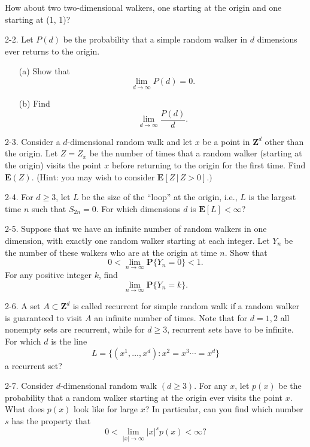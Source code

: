 \documentclass{stml-l}
\theoremstyle{definition}
\numberwithin{equation}{chapter}
\numberwithin{figure}{chapter}
\numberwithin{figure}{section}
\begin{document}
How about two two-dimensional walkers, one starting at the origin
and one starting at (1, 1)?

2-2. Let $P(d)$ be the probability that a simple random walker in
$d$ dimensions ever returns to the origin.
\begin{enumerate}
\item[(a)] Show that
\begin{equation*}
\lim\limits_{d\rightarrow\infty}P(d)=0.
\end{equation*}
\item[(b)] Find
\begin{equation*}
\lim\limits_{d\rightarrow\infty}\frac{P(d)}{d}.
\end{equation*}
\end{enumerate}

2-3. Consider a $d$-dimensional random walk and let $x$ be a point
in $\mathbf{Z}^{d}$ other than the origin. Let $Z=Z_{x}$ be the
number of times that a random walker (starting at the origin) visits
the point $x$ before returning to the origin for the first time.
Find $\mathbf{E}(Z)$. (Hint: you may wish to consider
$\mathbf{E}[Z\,|\,Z>0].)$

2-4. For $d\geq 3$, let $L$ be the size of the ``loop'' at the
origin, i.e., $L$ is the largest time $n$ such that $S_{2n}=0$. For
which dimensions $d$ is $\mathbf{E}[L]<\infty$?

2-5. Suppose that we have an infinite number of random walkers in
one dimension, with exactly one random walker starting at each
integer. Let $Y_{n}$ be the number of these walkers who are at the
origin at time $n$. Show that
\begin{equation*}
0<\lim\limits_{n\rightarrow\infty}\mathbf{P}\{Y_{n}=0\}<1.
\end{equation*}
For any positive integer $k$, find
\begin{equation*}
\lim\limits_{n\rightarrow\infty}\mathbf{P}\{Y_{n}=k\}.
\end{equation*}

2-6. A set $A\subset \mathbf{Z}^{d}$ is called recurrent for simple
random walk if a random walker is guaranteed to visit $A$ an
infinite number of times. Note that for $d=1,2$ all nonempty sets
are recurrent, while for $d\geq 3$, recurrent sets have to be
infinite. For which $d$ is the line
\begin{equation*}
L=\{(x^{1},\ldots,x^{d}):x^{2}=x^{3}\cdots=x^{d}\}
\end{equation*}
a recurrent set?

2-7. Consider $d$-dimensional random walk $(d\geq 3)$. For any $x$,
let $p(x)$ be the probability that a random walker starting at the
origin ever visits the point $x$. What does $p(x)$ look like for
large $x$? In particular, can you find which number $s$ has the
property that
\begin{equation*}
0<\lim\limits_{|x|\rightarrow\infty}|x|^{s}p(x)<\infty?
\end{equation*}
\end{document}

